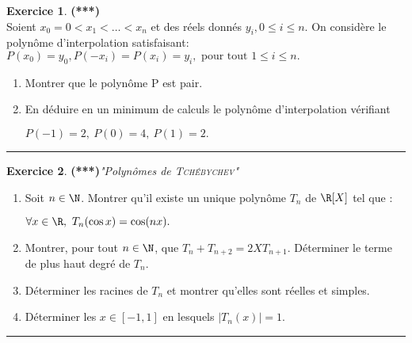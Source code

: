 \documentclass[a4paper,11pt]{article}
\theoremstyle{definition}
\newtheorem{exo}{Exercice} %
\begin{document}
\begin{minipage}{1\linewidth}
\begin{minipage}[t]{0.48\linewidth}
		
	
		
		\begin{exo}\textbf{(***)}\quad\\[0.2cm]
			Soient $x_0 = 0 < x_1 < \dots < x_n$ et des réels donnés $y_i , 0 \leq i \leq n$. On considère le	polynôme d'interpolation satisfaisant:\\[0.2cm]
			
			$P (x_0 ) = y_0 , P (-x_i ) = P (x_i ) = y_i , \text{ pour tout } 1 \leq i \leq n.$
			\begin{enumerate}
				\item Montrer que le polynôme P est pair.
				\item En déduire en un minimum de calculs le polynôme d’interpolation vérifiant
				
				$P (-1) = 2, \ P (0) = 4, \ P (1) = 2.$
			\end{enumerate}
			\centering
			\rule{1\linewidth}{0.6pt}
		\end{exo}
	
			
	\begin{exo}\textbf{(***)}\textit{"Polynômes de \textsc{Tchébychev}"}\\[0.2cm]
		\begin{enumerate}%
			\item Soit $n\in\N$. Montrer qu'il existe un unique polynôme $T_n$ de $\R[X]$ tel que : 
			
			\hfil$\forall x\in \R, \ T_n(\cos x) = \cos(nx).$ 
			\item Montrer, pour tout $n\in\N$, que $T_n +T_{n+2} = 2XT_{n+1}.$ Déterminer le terme de plus haut degré de $T_n$.
			\item Déterminer les racines de $T_n$ et montrer qu'elles sont réelles et simples.
			\item Déterminer les $x\in[-1,1]$ en lesquels $|T_n(x)|=1$.
			

		\end{enumerate}
				\centering
	\rule{1\linewidth}{0.6pt}

	\end{exo}
		
		
		
	\end{minipage}
\end{minipage}
\newpage 
\end{document}
